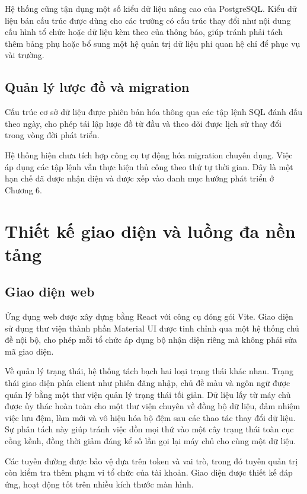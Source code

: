 \documentclass[12pt,a4paper,oneside]{report}
\begin{document}
Hệ thống cũng tận dụng một số kiểu dữ liệu nâng cao của PostgreSQL. Kiểu dữ liệu bán cấu trúc được dùng cho các trường có cấu trúc thay đổi như nội dung cấu hình tổ chức hoặc dữ liệu kèm theo của thông báo, giúp tránh phải tách thêm bảng phụ hoặc bổ sung một hệ quản trị dữ liệu phi quan hệ chỉ để phục vụ vài trường.

\subsection{Quản lý lược đồ và migration}

Cấu trúc cơ sở dữ liệu được phiên bản hóa thông qua các tập lệnh SQL đánh dấu theo ngày, cho phép tái lập lược đồ từ đầu và theo dõi được lịch sử thay đổi trong vòng đời phát triển.

Hệ thống hiện chưa tích hợp công cụ tự động hóa migration chuyên dụng. Việc áp dụng các tập lệnh vẫn thực hiện thủ công theo thứ tự thời gian. Đây là một hạn chế đã được nhận diện và được xếp vào danh mục hướng phát triển ở Chương 6.

\section{Thiết kế giao diện và luồng đa nền tảng}

\subsection{Giao diện web}

Ứng dụng web được xây dựng bằng React với công cụ đóng gói Vite. Giao diện sử dụng thư viện thành phần Material UI được tinh chỉnh qua một hệ thống chủ đề nội bộ, cho phép mỗi tổ chức áp dụng bộ nhận diện riêng mà không phải sửa mã giao diện.

Về quản lý trạng thái, hệ thống tách bạch hai loại trạng thái khác nhau. Trạng thái giao diện phía client như phiên đăng nhập, chủ đề màu và ngôn ngữ được quản lý bằng một thư viện quản lý trạng thái tối giản. Dữ liệu lấy từ máy chủ được ủy thác hoàn toàn cho một thư viện chuyên về đồng bộ dữ liệu, đảm nhiệm việc lưu đệm, làm mới và vô hiệu hóa bộ đệm sau các thao tác thay đổi dữ liệu. Sự phân tách này giúp tránh việc dồn mọi thứ vào một cây trạng thái toàn cục cồng kềnh, đồng thời giảm đáng kể số lần gọi lại máy chủ cho cùng một dữ liệu.

Các tuyến đường được bảo vệ dựa trên token và vai trò, trong đó tuyến quản trị còn kiểm tra thêm phạm vi tổ chức của tài khoản. Giao diện được thiết kế đáp ứng, hoạt động tốt trên nhiều kích thước màn hình.
\end{document}
